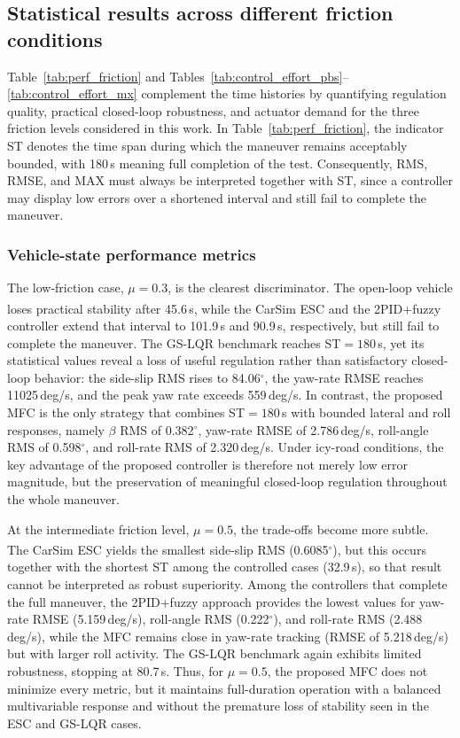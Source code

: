 \documentclass[sn-chicago,iicol]{sn-jnl}
\theoremstyle{thmstyleone}%
\theoremstyle{thmstyletwo}%
\theoremstyle{thmstylethree}%
\begin{document}
\subsection{Statistical results across different friction conditions}

Table~\ref{tab:perf_friction} and Tables~\ref{tab:control_effort_pbs}--\ref{tab:control_effort_mx} complement the time histories by quantifying regulation quality, practical closed-loop robustness, and actuator demand for the three friction levels considered in this work. In Table~\ref{tab:perf_friction}, the indicator ST denotes the time span during which the maneuver remains acceptably bounded, with 180\,s meaning full completion of the test. Consequently, RMS, RMSE, and MAX must always be interpreted together with ST, since a controller may display low errors over a shortened interval and still fail to complete the maneuver.

\subsubsection{Vehicle-state performance metrics}

The low-friction case, $\mu = 0.3$, is the clearest discriminator. The open-loop vehicle loses practical stability after 45.6\,s, while the CarSim\textsuperscript{\textregistered} ESC and the 2PID+fuzzy controller extend that interval to 101.9\,s and 90.9\,s, respectively, but still fail to complete the maneuver. The GS-LQR benchmark reaches ST$=180$\,s, yet its statistical values reveal a loss of useful regulation rather than satisfactory closed-loop behavior: the side-slip RMS rises to 84.06$^\circ$, the yaw-rate RMSE reaches 11025\,deg/s, and the peak yaw rate exceeds 559\,deg/s. In contrast, the proposed MFC is the only strategy that combines ST$=180$\,s with bounded lateral and roll responses, namely $\beta$ RMS of 0.382$^\circ$, yaw-rate RMSE of 2.786\,deg/s, roll-angle RMS of 0.598$^\circ$, and roll-rate RMS of 2.320\,deg/s. Under icy-road conditions, the key advantage of the proposed controller is therefore not merely low error magnitude, but the preservation of meaningful closed-loop regulation throughout the whole maneuver.

At the intermediate friction level, $\mu = 0.5$, the trade-offs become more subtle. The CarSim\textsuperscript{\textregistered} ESC yields the smallest side-slip RMS (0.6085$^\circ$), but this occurs together with the shortest ST among the controlled cases (32.9\,s), so that result cannot be interpreted as robust superiority. Among the controllers that complete the full maneuver, the 2PID+fuzzy approach provides the lowest values for yaw-rate RMSE (5.159\,deg/s), roll-angle RMS (0.222$^\circ$), and roll-rate RMS (2.488\,deg/s), while the MFC remains close in yaw-rate tracking (RMSE of 5.218\,deg/s) but with larger roll activity. The GS-LQR benchmark again exhibits limited robustness, stopping at 80.7\,s. Thus, for $\mu = 0.5$, the proposed MFC does not minimize every metric, but it maintains full-duration operation with a balanced multivariable response and without the premature loss of stability seen in the ESC and GS-LQR cases.
\end{document}

